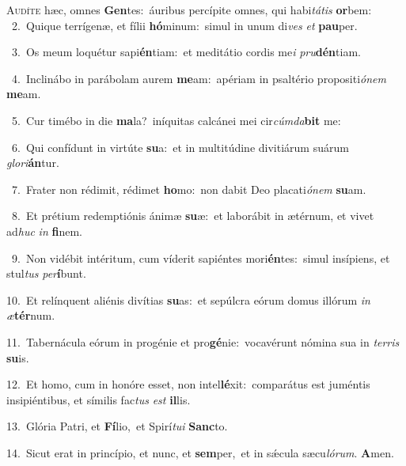 \lettrine{\initial\textcolor{\initialcolor}{A}}{udíte} hæc, omnes \textbf{Gen}\-tes:~\star áuribus percípite omnes, qui habi\-\textit{tá}\-\textit{tis} \textbf{or}\-bem:\\
{\numbfont\textcolor{\numbcolor}{~2.}}~Quique terrígenæ, et fílii \textbf{hó}\-minum:~\star simul in unum di\textit{ves} \textit{et} \textbf{pau}\-per.\par
{\numbfont\textcolor{\numbcolor}{~3.}}~Os meum loquétur sapi\-\textbf{én}\-tiam:~\star et meditátio cordis me\textit{i} \textit{pru}\-\textbf{dén}tiam.\par
{\numbfont\textcolor{\numbcolor}{~4.}}~Inclinábo in parábolam aurem \textbf{me}\-am:~\star apériam in psaltério propositi\-\textit{ó}\-\textit{nem} \textbf{me}\-am.\par
{\numbfont\textcolor{\numbcolor}{~5.}}~Cur timébo in die \textbf{ma}\-la?~\star iníquitas calcánei mei cir\-\textit{cúm}\-\textit{da}\textbf{bit} me:\par
{\numbfont\textcolor{\numbcolor}{~6.}}~Qui confídunt in virtúte \textbf{su}\-a:~\star et in multitúdine divitiárum suárum \textit{glo}\-\textit{ri}\textbf{án}tur.\par
{\numbfont\textcolor{\numbcolor}{~7.}}~Frater non rédimit, rédimet \textbf{ho}\-mo:~\star non dabit Deo placati\-\textit{ó}\-\textit{nem} \textbf{su}\-am.\par
{\numbfont\textcolor{\numbcolor}{~8.}}~Et prétium redemptiónis ánimæ \textbf{su}\-æ:~\star et laborábit in ætérnum, et vivet ad\textit{huc} \textit{in} \textbf{fi}\-nem.\par
{\numbfont\textcolor{\numbcolor}{~9.}}~Non vidébit intéritum, cum víderit sapiéntes mori\-\textbf{én}\-tes:~\star simul insípiens, et stul\textit{tus} \textit{per}\-\textbf{í}bunt.\par
{\numbfont\textcolor{\numbcolor}{10.}}~Et relínquent aliénis divítias \textbf{su}\-as:~\star et sepúlcra eórum domus illórum \textit{in} \textit{æ}\-\textbf{tér}num.\par
{\numbfont\textcolor{\numbcolor}{11.}}~Tabernácula eórum in progénie et pro\-\textbf{gé}\-nie:~\star vocavérunt nómina sua in \textit{ter}\-\textit{ris} \textbf{su}\-is.\par
{\numbfont\textcolor{\numbcolor}{12.}}~Et homo, cum in honóre esset, non intel\-\textbf{lé}\-xit:~\star comparátus est juméntis insipiéntibus, et símilis fac\textit{tus} \textit{est} \textbf{il}\-lis.\par
{\numbfont\textcolor{\numbcolor}{13.}}~Glória Patri, et \textbf{Fí}\-lio,~\star et Spirí\-\textit{tu}\-\textit{i} \textbf{Sanc}\-to.\par
{\numbfont\textcolor{\numbcolor}{14.}}~Sicut erat in princípio, et nunc, et \textbf{sem}\-per,~\star et in sǽcula sæcu\-\textit{ló}\-\textit{rum}. \textbf{A}\-men.\par
